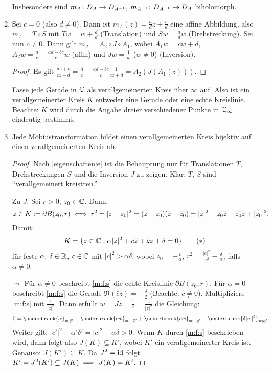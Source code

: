 \documentclass[a4paper,twoside,DIV15,BCOR12mm]{scrbook}
\begin{document}
\begin{enumerate}
Insbesondere sind $m_A\colon D_A\rightarrow D_{A^{-1}}$, $m_{A^{-1}}\colon D_{A^{-1}}\rightarrow D_A$ biholomorph.
\item\label{eigenschaften:e} Sei $c=0$ (also $d\neq0$). Dann ist $m_A(z) = \frac{a}{d}z + \frac{b}{d}$ eine affine Abbildung, also $m_A = T \circ S$
  mit $Tw=w+\frac{d}{d}$ (Translation) und $Sw = \frac{a}{d}w$ (Drehstreckung). Sei nun $c\neq0$. Dann gilt $m_A = A_2 \circ J
  \circ A_1$, wobei $A_1w = cw+d$, $A_2w = \frac{a}{c} - \frac{ad-bc}{c}w$ (affin) und $Jw = \frac1w$ ($w\neq0$) (Inversion).
  \begin{proof}
    Es gilt $\displaystyle\frac{az+b}{cz+d} = \frac{a}{c} - \frac{ad-bc}{c}\frac{1}{cz+d} = A_2(J(A_1(z)))$.
  \end{proof}
Fasse jede Gerade in $\mathbb{C}$ als verallgemeinerten Kreis über $\infty$ auf. Also ist ein verallgemeinerter Kreis $K$ entweder eine Gerade oder eine echte Kreislinie. Beachte: $K$ wird durch die Angabe dreier verschiedener Punkte in $\mathbb{C}_\infty$ eindeutig bestimmt.
\item\label{eigenschaften:f} Jede Möbiustransformation bildet einen verallgemeinerten Kreis bijektiv auf einen verallgemeinerten Kreis ab.
\begin{proof} Nach \ref{eigenschaften:e}
 ist die Behauptung nur für Translationen $T$, Drehstreckungen $S$ und die Inversion $J$ zu zeigen. Klar: $T$, $S$ sind "`verallgemeinert kreistreu."'

Zu $J$: Sei $r>0$, $z_0\in\mathbb{C}$. Dann:
\[z\in K:= \partial B(z_0,r)\iff r^2 = |z-z_0|^2 = (z-z_0)(\overline{z}-\overline{z_0}) = |z|^2-z_0\overline{z}-\overline{z_0}z+|z_0|^2.\]
Damit: 
\[\label{m:f:s}K=\{z\in\mathbb{C}: \alpha|z|^2+c\overline{z}+\overline{c}z+\delta = 0\}\tag{$*$}\]
für feste $\alpha$, $\delta\in\mathbb{R}$, $c\in\mathbb{C}$ mit $|c|^2>\alpha\delta$, wobei $z_0=-\frac{c}{\alpha}$, $r^2=\frac{|c|^2}{\alpha^2}-\frac{\delta}{\alpha}$, falls $\alpha\neq 0$.

$\leadsto$ Für $\alpha\neq 0$ beschreibt \eqref{m:f:s} die echte Kreislinie $\partial B(z_0,r)$. Für $\alpha = 0$ beschreibt \eqref{m:f:s} die Gerade $\Re(\bar{c}z) = -\frac{\delta}{2}$ (Beachte: $c\neq 0$). Multipliziere \eqref{m:f:s} mit $\frac{1}{|z|^2}$. Dann erfüllt $w = Jz = \frac{1}{z} = \frac{\bar{z}}{|z|^2}$ die Gleichung:
\[ 0 = \underbrack{\alpha}_{\ad\delta'} + \underbrack{cw}_{\ad -\bar{c}'} + \underbrack{\bar{c}\bar{w}}_{\ad -c'} + \underbrack{\delta|w|^2}_{\ad\alpha'}.\]
Weiter gilt: $|c'|^2-\alpha'\delta' = |c|^2-\alpha\delta > 0$. Wenn $K$ durch \eqref{m:f:s} beschrieben wird, dann folgt also $J(K)\subseteq K'$, wobei $K'$ ein verallgemeinerter Kreis ist. Genauso: $J(K')\subseteq K$. Da $J^2 = \mathrm{id}$ folgt $K'=J^2(K')\subseteq J(K)\implies J(K)=K'$.
\end{proof}
\end{enumerate}
\end{document}
